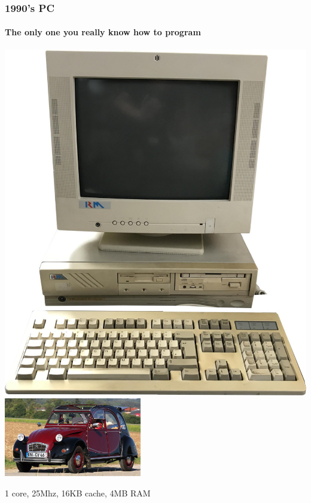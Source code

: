 \documentclass[xcolor={x11names,svgnames,psnames}]{beamer}
\begin{document}
\begin{frame}
  \frametitle{1990's PC}
  \framesubtitle{The only one you really know how to program}
  
  \centering
  \includegraphics[height=0.5\textheight]{old_pc}
  \hfill
  \includegraphics[width=6cm]{2cv}

  \bigskip

  1 core, 25Mhz, 16KB cache, 4MB RAM
\end{frame}

\end{document}
